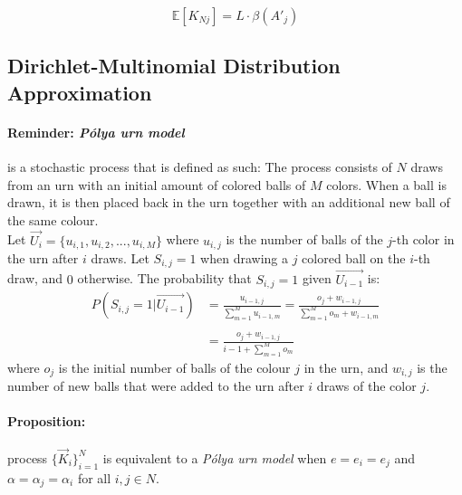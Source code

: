 \documentclass[11pt]{article}
\begin{document}
\begin{equation}\label{linearEq}
\mathbb{E}[K_{Nj}] = L\cdot \beta(A'_j)
\end{equation}


\subsection{Dirichlet-Multinomial Distribution Approximation}
\paragraph{Reminder: \textit{Pólya urn model}}  is a stochastic process that is defined as such: 
The process consists of $N$ draws from an urn with an initial amount of colored balls of $M$ colors. When a ball is drawn, it is then placed back in the urn together with an additional new ball of the same colour.\\
Let $\vec{U_i} = \{u_{i,1},u_{i,2},...,u_{i,M}\}$  where $u_{i,j}$ is the number of balls of the $j$-th color in the urn after $i$ draws.
Let $S_{i,j}=1$ when drawing a $j$ colored ball on the $i$-th draw, and $0$ otherwise. The probability that $S_{i,j}=1$ given $\vec{U_{i-1}}$ is:
\begin{equation}\label{polya}
\begin{split}
P(S_{i,j} = 1 | \vec{U_{i-1}}) & = \frac{u_{i-1,j}}{\sum\limits_{m=1}^{M} u_{i-1,m}} = \frac{o_j + w_{i-1,j}}{\sum\limits_{m=1}^{M} o_m + w_{i-1,m}}\\\\
 & = \frac{o_j + w_{i-1,j}}{i-1 + \sum\limits_{m=1}^{M} o_m}
\end{split}
\end{equation}
where $o_j$ is the initial number of balls of the colour $j$ in the urn, and $w_{i,j}$ is the number of new balls that were added to the urn after $i$ draws of the color $j$.

\paragraph{Proposition:} process $\big\{\vec{K}_i\big\}_{i=1}^N$ is equivalent to a \textit{Pólya urn model} when $e=e_i=e_j$ and $\alpha=\alpha_j=\alpha_i$ for all $i,j \in N$.
\end{document}

